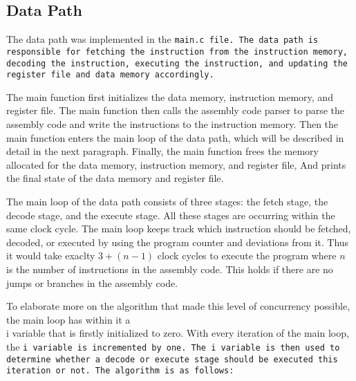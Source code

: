 \documentclass[a4paper,12pt]{article}
\begin{document}
	\subsection{Data Path}
		\par{
			The data path was implemented in the \tt{main.c} file. The data path
			is responsible for fetching the instruction from the instruction memory,
			decoding the instruction, executing the instruction, and updating the
			register file and data memory accordingly.
		}
		\par{
			The main function first initializes the data memory, instruction memory,
			and register file. The main function then calls the assembly code parser
			to parse the assembly code and write the instructions to the instruction
			memory. Then the main function enters the main loop of the data path, which will
			be described in detail in the next paragraph. Finally, the main function
			frees the memory allocated for the data memory, instruction memory, and
			register file, And prints the final state of the data memory and register
			file.
		}
		\par{
			The main loop of the data path consists of three stages: the fetch stage,
			the decode stage, and the execute stage. All these stages are occurring
			within the same clock cycle. The main loop keeps track which instruction
			should be fetched, decoded, or executed by using the program counter and
			deviations from it. Thus it would take exaclty $3 + (n - 1)$ clock cycles
			to execute the program where $n$ is the number of instructions in the
			assembly code. This holds if there are no jumps or branches in the
			assembly code.
		}
		\par{
			To elaborate more on the algorithm that made this level of concurrency
			possible, the main loop has within it a \\{i} variable that is firstly
			initialized to zero. With every iteration of the main loop, the \tt{i}
			variable is incremented by one. The \tt{i} variable is then used to
			determine whether a decode or execute stage should be executed this
			iteration or not. The algorithm is as follows:
		}
\end{document}
